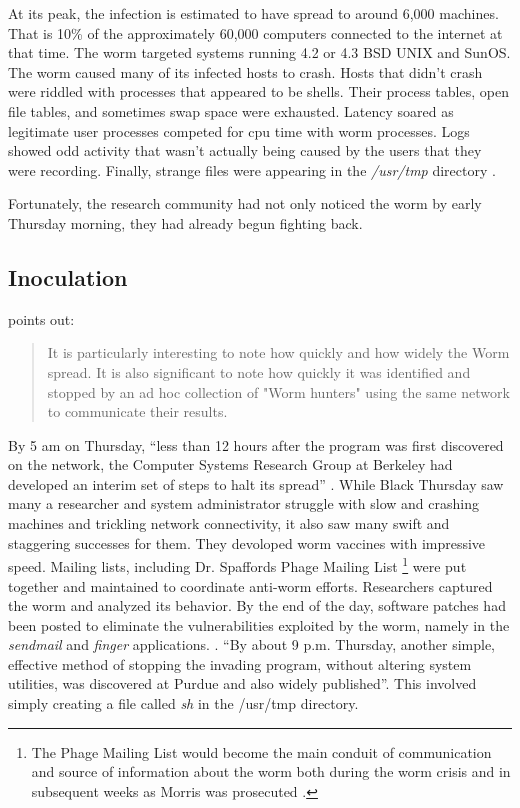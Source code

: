 At its peak, the infection is estimated to have spread to around 6,000 machines.
That is 10\% of the approximately 60,000 computers connected to the internet at
that time\cite{eichin_microscope_1989}\cite{marsan_morris_2008}. The worm
targeted systems running 4.2 or 4.3 BSD UNIX and SunOS. The worm
caused many of its infected hosts to crash.
Hosts that didn't crash were riddled with processes that appeared to be shells.
Their process tables, open file tables, and sometimes swap space were exhausted.
Latency soared as legitimate user processes competed for cpu time with worm
processes. Logs showed odd activity that wasn't actually being caused by the
users that they were recording. Finally, strange files were appearing in the
\textit{/usr/tmp} directory \cite{seeley_tour_1989}\cite{spafford_crisis_1989}.

Fortunately, the research community had not only noticed the worm by early
Thursday morning, they had already begun fighting back.



\subsection*{Inoculation}

\cite{spafford_internet_1989-1} points out:
\begin{quote}
It is particularly interesting to note how quickly and how widely the Worm spread.
It is also significant to note how quickly it was identified and stopped by an
ad hoc collection of "Worm hunters" using the same network to communicate their
results.
\end{quote}

By 5 am on Thursday, ``less than 12 hours after the program was first discovered on the network, the Computer Systems Research Group at Berkeley had
developed an interim set of steps to halt its spread''
\cite{spafford_crisis_1989}. While Black Thursday saw many a researcher and
system administrator struggle with slow and crashing machines and trickling
network connectivity, it also saw many swift and staggering successes for them.
They devoloped worm vaccines with impressive speed. 
Mailing lists, including Dr. Spaffords Phage Mailing List
\footnote{
The Phage Mailing List would become the main conduit of communication and source
of information about the worm both during the worm crisis and in subsequent weeks as Morris
was prosecuted
\cite{spafford_crisis_1989}\cite{spafford_internet_1989-1}\cite{lee_washpost_2013}.
} 
were put together and maintained to coordinate anti-worm efforts.
Researchers captured the worm and analyzed its behavior. By the end of the day,
software patches had been posted to eliminate the vulnerabilities exploited by the worm, namely in the 
\textit{sendmail} and \textit{finger} applications.
\cite{spafford_crisis_1989}
\cite{seeley_tour_1989}. ``By about 9 p.m. Thursday, another simple, effective
method of stopping the invading program, without altering system utilities, was discovered at Purdue
and also widely published''\cite{spafford_internet_1989-1}. This involved simply
creating a file called \textit{sh} in the /usr/tmp directory.

